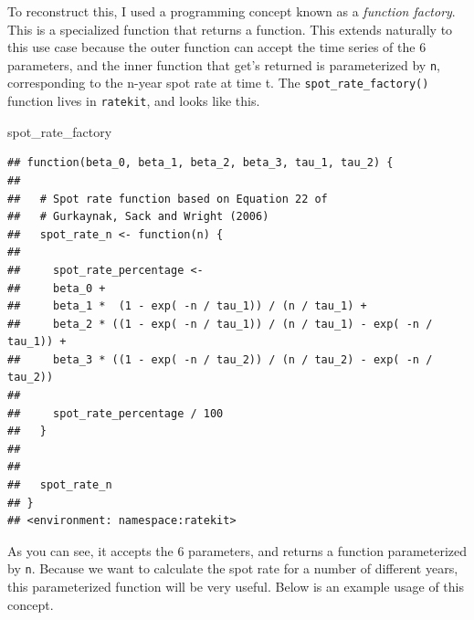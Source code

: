 \documentclass[]{book}
\newenvironment{Shaded}{\begin{snugshade}}{\end{snugshade}}
\newcommand{\NormalTok}[1]{#1}
\theoremstyle{definition}
\theoremstyle{definition}
\theoremstyle{definition}
\theoremstyle{remark}
\begin{document}
To reconstruct this, I used a programming concept known as a
\emph{function factory}. This is a specialized function that returns a
function. This extends naturally to this use case because the outer
function can accept the time series of the 6 parameters, and the inner
function that get's returned is parameterized by \texttt{n},
corresponding to the n-year spot rate at time t. The
\texttt{spot\_rate\_factory()} function lives in \texttt{ratekit}, and
looks like this.

\begin{Shaded}
\begin{Highlighting}[]
\NormalTok{spot_rate_factory}
\end{Highlighting}
\end{Shaded}

\begin{verbatim}
## function(beta_0, beta_1, beta_2, beta_3, tau_1, tau_2) {
## 
##   # Spot rate function based on Equation 22 of
##   # Gurkaynak, Sack and Wright (2006)
##   spot_rate_n <- function(n) {
## 
##     spot_rate_percentage <-
##     beta_0 +
##     beta_1 *  (1 - exp( -n / tau_1)) / (n / tau_1) +
##     beta_2 * ((1 - exp( -n / tau_1)) / (n / tau_1) - exp( -n / tau_1)) +
##     beta_3 * ((1 - exp( -n / tau_2)) / (n / tau_2) - exp( -n / tau_2))
## 
##     spot_rate_percentage / 100
##   }
## 
## 
##   spot_rate_n
## }
## <environment: namespace:ratekit>
\end{verbatim}

As you can see, it accepts the 6 parameters, and returns a function
parameterized by \texttt{n}. Because we want to calculate the spot rate
for a number of different years, this parameterized function will be
very useful. Below is an example usage of this concept.
\end{document}

